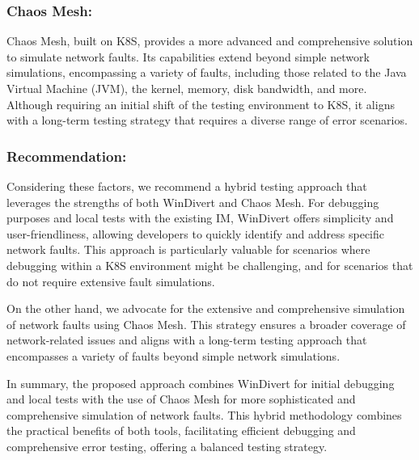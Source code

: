 \subsubsection{Chaos Mesh:}
Chaos Mesh, built on \acf{K8S}, provides a more advanced and comprehensive solution to simulate network faults. Its capabilities extend beyond simple network simulations, encompassing a variety of faults, including those related to the Java Virtual Machine (JVM), the kernel, memory, disk bandwidth, and more. Although requiring an initial shift of the testing environment to \acf{K8S}, it aligns with a long-term testing strategy that requires a diverse range of error scenarios.

\subsubsection{Recommendation:}
Considering these factors, we recommend a hybrid testing approach that leverages the strengths of both WinDivert and Chaos Mesh. For debugging purposes and local tests with the existing \ac{IM}, WinDivert offers simplicity and user-friendliness, allowing developers to quickly identify and address specific network faults. This approach is particularly valuable for scenarios where debugging within a \ac{K8S} environment might be challenging, and for scenarios that do not require extensive fault simulations.

On the other hand, we advocate for the extensive and comprehensive simulation of network faults using Chaos Mesh. This strategy ensures a broader coverage of network-related issues and aligns with a long-term testing approach that encompasses a variety of faults beyond simple network simulations.

In summary, the proposed approach combines WinDivert for initial debugging and local tests with the use of Chaos Mesh for more sophisticated and comprehensive simulation of network faults. This hybrid methodology combines the practical benefits of both tools, facilitating efficient debugging and comprehensive error testing, offering a balanced testing strategy.
